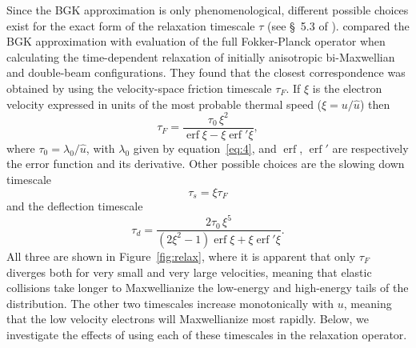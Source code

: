 \documentclass{emulateapj}
\newcommand\ubar{\ensuremath{\hat{u}}}
\begin{document}
Since the BGK approximation is only phenomenological, different
possible choices exist for the exact form of the relaxation timescale
\(\tau\)
(see \S~5.3 of \citealp{Spitzer:1956a}).  \citet{Livi:1986a} compared the
BGK approximation with evaluation of the full Fokker-Planck operator
when calculating the time-dependent relaxation of initially
anisotropic bi-Maxwellian and double-beam configurations.  They found
that the closest correspondence was obtained by using the
velocity-space friction timescale \(\tau_{F}\).  If \(\xi\)
is the electron velocity expressed in units of the most probable thermal speed
(\(\xi = u /\ubar\)) then \newcommand\erf{\operatorname{erf}}
\begin{equation}
  \label{eq:3}
  \tau_{F} = \frac{\tau_0 \, \xi^2}{\erf\xi - \xi\erf'\!\xi}, 
\end{equation}
where \(\tau_0 = \lambda_0 / \ubar\), with \(\lambda_0\) given by
equation~\eqref{eq:4}, and \(\erf\), \(\erf'\) are respectively the
error function and its derivative. Other possible
choices are the slowing down timescale
\begin{equation}
  \label{eq:9}
  \tau_{s} = \xi \tau_{F} 
\end{equation}
and the deflection timescale 
\begin{equation}
  \label{eq:10}
  \tau_{d} = \frac{2 \tau_0 \, \xi^5}{(2\xi^2 - 1)\erf\xi + \xi\erf'\!\xi} .  
\end{equation}
All three are shown in Figure~\ref{fig:relax}, where it is apparent
that only \(\tau_F\)
diverges both for very small and very large velocities, meaning that
elastic collisions take longer to Maxwellianize the low-energy and
high-energy tails of the distribution.  The other two timescales
increase monotonically with \(u\),
meaning that the low velocity electrons will Maxwellianize most
rapidly.  Below, we investigate the effects of using each of these
timescales in the relaxation operator.
\end{document}
